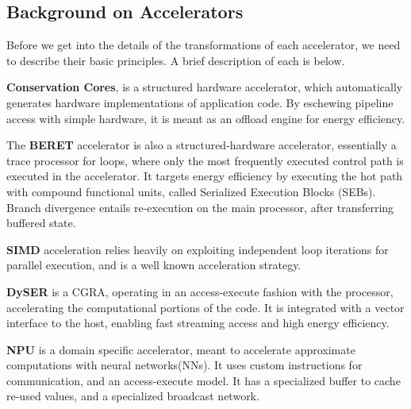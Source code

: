 \subsection{Background on Accelerators}
Before we get into the details of the transformations of each accelerator, we need to
describe their basic principles.  A brief description of each is below.

\textbf{Conservation Cores}, is a structured hardware accelerator,
which automatically generates hardware implementations of application code.
By eschewing pipeline access with simple hardware, it is meant as an offload 
engine for energy efficiency.  

The \textbf{BERET} accelerator is also a structured-hardware accelerator,
essentially a trace processor for loops, where only the most frequently 
executed control path is executed in the accelerator.  
It targets energy efficiency by executing the hot path with compound functional 
units, called Serialized Execution Blocks (SEBs). 
Branch divergence entails re-execution on the main processor, 
after transferring buffered state.

\textbf{SIMD} acceleration relies heavily on exploiting independent loop iterations for
parallel execution, and is a well known acceleration strategy.  

\textbf{DySER} is a CGRA, operating in an access-execute fashion with the 
processor, accelerating the computational portions of the code.  
It is integrated with a vector interface to the host, enabling fast
streaming access and high energy efficiency.

\textbf{NPU} is a domain specific accelerator, meant to accelerate approximate
computations with neural networks(NNs).  It uses custom instructions for communication,
             and an access-execute model. 
It has a specialized buffer to cache re-used values, and a specialized
broadcast network.
\fi

